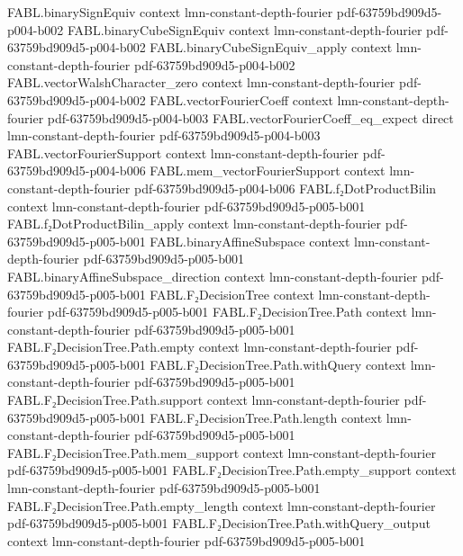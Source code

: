 \begin{theorem}
\proofstep
  {FABL.binarySignEquiv}
  {context}
  {lmn-constant-depth-fourier}
  {pdf-63759bd909d5-p004-b002}
\proofstep
  {FABL.binaryCubeSignEquiv}
  {context}
  {lmn-constant-depth-fourier}
  {pdf-63759bd909d5-p004-b002}
\proofstep
  {FABL.binaryCubeSignEquiv_apply}
  {context}
  {lmn-constant-depth-fourier}
  {pdf-63759bd909d5-p004-b002}
\proofstep
  {FABL.vectorWalshCharacter_zero}
  {context}
  {lmn-constant-depth-fourier}
  {pdf-63759bd909d5-p004-b002}
\proofstep
  {FABL.vectorFourierCoeff}
  {context}
  {lmn-constant-depth-fourier}
  {pdf-63759bd909d5-p004-b003}
\proofstep
  {FABL.vectorFourierCoeff_eq_expect}
  {direct}
  {lmn-constant-depth-fourier}
  {pdf-63759bd909d5-p004-b003}
\proofstep
  {FABL.vectorFourierSupport}
  {context}
  {lmn-constant-depth-fourier}
  {pdf-63759bd909d5-p004-b006}
\proofstep
  {FABL.mem_vectorFourierSupport}
  {context}
  {lmn-constant-depth-fourier}
  {pdf-63759bd909d5-p004-b006}
\proofstep
  {FABL.f₂DotProductBilin}
  {context}
  {lmn-constant-depth-fourier}
  {pdf-63759bd909d5-p005-b001}
\proofstep
  {FABL.f₂DotProductBilin_apply}
  {context}
  {lmn-constant-depth-fourier}
  {pdf-63759bd909d5-p005-b001}
\proofstep
  {FABL.binaryAffineSubspace}
  {context}
  {lmn-constant-depth-fourier}
  {pdf-63759bd909d5-p005-b001}
\proofstep
  {FABL.binaryAffineSubspace_direction}
  {context}
  {lmn-constant-depth-fourier}
  {pdf-63759bd909d5-p005-b001}
\proofstep
  {FABL.F₂DecisionTree}
  {context}
  {lmn-constant-depth-fourier}
  {pdf-63759bd909d5-p005-b001}
\proofstep
  {FABL.F₂DecisionTree.Path}
  {context}
  {lmn-constant-depth-fourier}
  {pdf-63759bd909d5-p005-b001}
\proofstep
  {FABL.F₂DecisionTree.Path.empty}
  {context}
  {lmn-constant-depth-fourier}
  {pdf-63759bd909d5-p005-b001}
\proofstep
  {FABL.F₂DecisionTree.Path.withQuery}
  {context}
  {lmn-constant-depth-fourier}
  {pdf-63759bd909d5-p005-b001}
\proofstep
  {FABL.F₂DecisionTree.Path.support}
  {context}
  {lmn-constant-depth-fourier}
  {pdf-63759bd909d5-p005-b001}
\proofstep
  {FABL.F₂DecisionTree.Path.length}
  {context}
  {lmn-constant-depth-fourier}
  {pdf-63759bd909d5-p005-b001}
\proofstep
  {FABL.F₂DecisionTree.Path.mem_support}
  {context}
  {lmn-constant-depth-fourier}
  {pdf-63759bd909d5-p005-b001}
\proofstep
  {FABL.F₂DecisionTree.Path.empty_support}
  {context}
  {lmn-constant-depth-fourier}
  {pdf-63759bd909d5-p005-b001}
\proofstep
  {FABL.F₂DecisionTree.Path.empty_length}
  {context}
  {lmn-constant-depth-fourier}
  {pdf-63759bd909d5-p005-b001}
\proofstep
  {FABL.F₂DecisionTree.Path.withQuery_output}
  {context}
  {lmn-constant-depth-fourier}
  {pdf-63759bd909d5-p005-b001}

\end{theorem}
